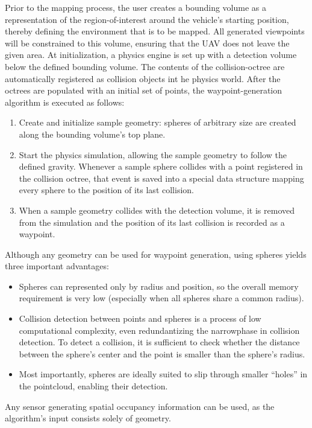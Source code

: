\documentclass[a4paper, 10pt, conference]{ieeeconf}      %
\begin{document}
Prior to the mapping process, the user creates a bounding volume as a representation of the region-of-interest around the vehicle's starting position, thereby defining the environment that is to be mapped. All generated viewpoints will be constrained to this volume, ensuring that the UAV does not leave the given area. At initialization, a physics engine is set up with a detection volume below the defined bounding volume. The contents of the collision-octree are automatically registered as collision objects int he physics world. After the octrees are populated with an initial set of points, the waypoint-generation algorithm is executed as follows:

\begin{enumerate}
     \item Create and initialize sample geometry: spheres of arbitrary size are created along the bounding volume's top plane.
     \item Start the physics simulation, allowing the sample geometry to follow the defined gravity. Whenever a sample sphere collides with a point registered in the collision octree, that event is saved into a special data structure mapping every sphere to the position of its last collision.
     \item When a sample geometry collides with the detection volume, it is removed from the simulation and the position of its last collision is recorded as a waypoint.
\end{enumerate}

Although any geometry can be used for waypoint generation, using spheres yields three important advantages:
\begin{itemize}
  \item Spheres can represented only by radius and position, so the overall memory requirement is very low (especially when all spheres share a common radius).
  \item Collision detection between points and spheres is a process of low computational complexity, even redundantizing the narrowphase in collision detection. To detect a collision, it is sufficient to check whether the distance between the sphere's center and the point is smaller than the sphere's radius.
  \item Most importantly, spheres are ideally suited to slip through smaller ``holes'' in the pointcloud, enabling their detection.
\end{itemize}

Any sensor generating spatial occupancy information can be used, as the algorithm's input consists solely of geometry.
\end{document}
